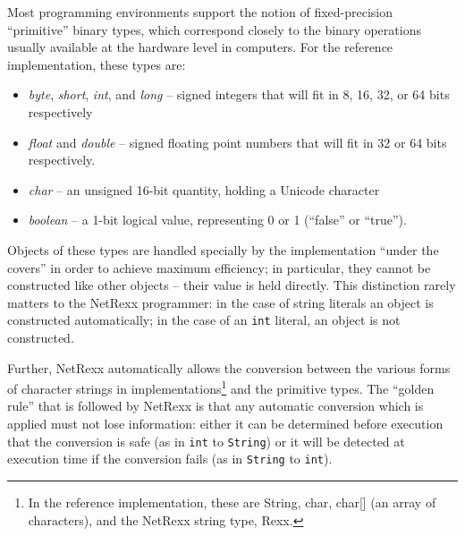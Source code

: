 Most programming environments support the notion of fixed-precision
“primitive” binary types, which correspond closely to the binary
operations usually available at the hardware level in computers. For
the reference implementation, these types are:
\begin{itemize}
\item \emph{byte}, \emph{short}, \emph{int}, and \emph{long} – signed integers that will fit in 8, 16, 32, or 64 bits respectively
\item \emph{float} and \emph{double} – signed floating point numbers that will fit in 32 or 64 bits respectively.
\item \emph{char} – an unsigned 16-bit quantity, holding a Unicode character
\item \emph{boolean} – a 1-bit logical value, representing 0 or 1
    (“false” or “true”).
\end{itemize}
Objects of these types are handled specially by the implementation “under the covers” in order to achieve maximum efficiency; in particular, they cannot be constructed like other objects – their value is held directly. This distinction rarely matters to the NetRexx programmer: in the case of string literals an object is constructed automatically; in the case of an \texttt{int} literal, an object is not constructed.

Further, NetRexx automatically allows the conversion between the
various forms of character strings in implementations\footnote{In the
  reference implementation, these are String, char, char[] (an array
  of characters), and the NetRexx string type, Rexx.} and the
primitive types. The “golden rule” that is followed by NetRexx is that
any automatic conversion which is applied must not lose information:
either it can be determined before execution that the conversion is
safe (as in \texttt{int} to \texttt{String}) or it will be detected at
execution time if the conversion fails (as in \texttt{String} to
\texttt {int}).

